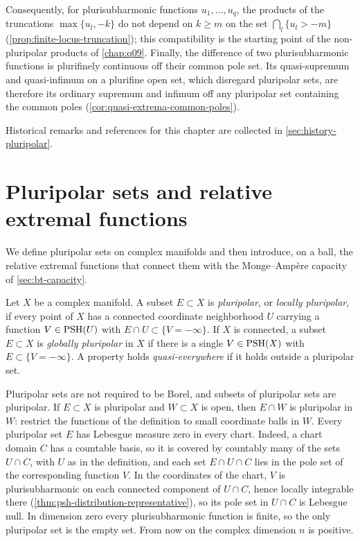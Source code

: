 Consequently, for plurisubharmonic functions $u_1,\ldots,u_q$, the products of the truncations $\max\{u_l,-k\}$ do not depend on $k\ge m$ on the set $\bigcap_l\{u_l>-m\}$ (\cref{prop:finite-locus-truncation}); this compatibility is the starting point of the non-pluripolar products of \cref{chap:q09}. Finally, the difference of two plurisubharmonic functions is plurifinely continuous off their common pole set. Its quasi-supremum and quasi-infimum on a plurifine open set, which disregard pluripolar sets, are therefore its ordinary supremum and infimum off any pluripolar set containing the common poles (\cref{cor:quasi-extrema-common-poles}).

Historical remarks and references for this chapter are collected in \cref{sec:history-pluripolar}.

\section{Pluripolar sets and relative extremal functions}
\label{sec:pluripolar-extremals}

We define pluripolar sets on complex manifolds and then introduce, on a ball, the relative extremal functions that connect them with the Monge--Amp\`ere capacity of \cref{sec:bt-capacity}.

\begin{definition}\label{def:pluripolar-set}
Let $X$ be a complex manifold. A subset $E\subset X$ is \emph{pluripolar}, or \emph{locally pluripolar}, if every point of $X$ has a connected coordinate neighborhood $U$ carrying a function $V\in\mathrm{PSH}(U)$ with $E\cap U\subset\{V=-\infty\}$. If $X$ is connected, a subset $E\subset X$ is \emph{globally pluripolar} in $X$ if there is a single $V\in\mathrm{PSH}(X)$ with $E\subset\{V=-\infty\}$. A property holds \emph{quasi-everywhere} if it holds outside a pluripolar set.
\end{definition}

Pluripolar sets are not required to be Borel, and subsets of pluripolar sets are pluripolar. If $E\subset X$ is pluripolar and $W\subset X$ is open, then $E\cap W$ is pluripolar in $W$: restrict the functions of the definition to small coordinate balls in $W$. Every pluripolar set $E$ has Lebesgue measure zero in every chart. Indeed, a chart domain $C$ has a countable basis, so it is covered by countably many of the sets $U\cap C$, with $U$ as in the definition, and each set $E\cap U\cap C$ lies in the pole set of the corresponding function $V$. In the coordinates of the chart, $V$ is plurisubharmonic on each connected component of $U\cap C$, hence locally integrable there (\cref{thm:psh-distribution-representative}), so its pole set in $U\cap C$ is Lebesgue null. In dimension zero every plurisubharmonic function is finite, so the only pluripolar set is the empty set. From now on the complex dimension $n$ is positive.

